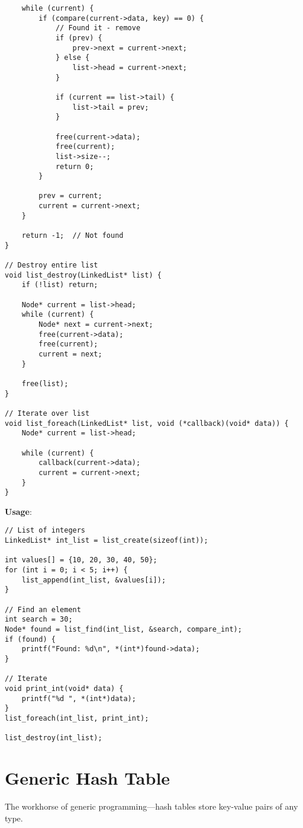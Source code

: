 \begin{lstlisting}
    while (current) {
        if (compare(current->data, key) == 0) {
            // Found it - remove
            if (prev) {
                prev->next = current->next;
            } else {
                list->head = current->next;
            }

            if (current == list->tail) {
                list->tail = prev;
            }

            free(current->data);
            free(current);
            list->size--;
            return 0;
        }

        prev = current;
        current = current->next;
    }

    return -1;  // Not found
}

// Destroy entire list
void list_destroy(LinkedList* list) {
    if (!list) return;

    Node* current = list->head;
    while (current) {
        Node* next = current->next;
        free(current->data);
        free(current);
        current = next;
    }

    free(list);
}

// Iterate over list
void list_foreach(LinkedList* list, void (*callback)(void* data)) {
    Node* current = list->head;

    while (current) {
        callback(current->data);
        current = current->next;
    }
}
\end{lstlisting}

\textbf{Usage}:

\begin{lstlisting}
// List of integers
LinkedList* int_list = list_create(sizeof(int));

int values[] = {10, 20, 30, 40, 50};
for (int i = 0; i < 5; i++) {
    list_append(int_list, &values[i]);
}

// Find an element
int search = 30;
Node* found = list_find(int_list, &search, compare_int);
if (found) {
    printf("Found: %d\n", *(int*)found->data);
}

// Iterate
void print_int(void* data) {
    printf("%d ", *(int*)data);
}
list_foreach(int_list, print_int);

list_destroy(int_list);
\end{lstlisting}

\section{Generic Hash Table}

The workhorse of generic programming—hash tables store key-value pairs of any type.

